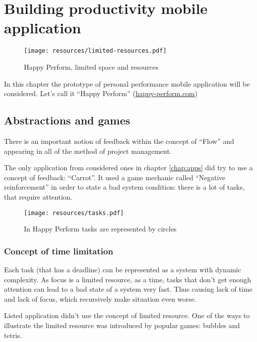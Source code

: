 \chapter{Building productivity mobile application}

\begin{wrapfigure}[16]{r}[0pt]{0.3\linewidth}
   \centering
	\texttt{[image: resources/limited-resources.pdf]}
	\caption[Happy Perform, limited space and resources]{Happy Perform, limited space and resources}
\end{wrapfigure}

In this chapter the prototype of personal performance mobile application will be considered. Let's call it ``Happy Perform'' (\url{happy-perform.com})

\section{Abstractions and games}
There is an important notion of feedback within the concept of ``Flow'' and appearing in all of the method of project management.

The only application from considered ones in chapter \ref{chap:apps} did try to use a concept of feedback: ``Carrot''. It used a game mechanic called ``Negative reinforcement'' in order to state a bad system condition: there is a lot of tasks, that require attention.

\begin{figure}
   \centering
	\texttt{[image: resources/tasks.pdf]}
	\caption[Happy Perform, tasks representation]{In Happy Perform tasks are represented by circles}
\end{figure}

\subsection{Concept of time limitation}

Each task (that has a deadline) can be represented as a system with dynamic complexity. As focus is a limited resource, as a time, tasks that don't get enough attention can lead to a bad state of a system very fast. Thus causing lack of time and lack of focus, which recursively make situation even worse.

Listed application didn't use the concept of limited resource. One of the ways to illustrate the limited resource was introduced by popular games: bubbles and tetris.

